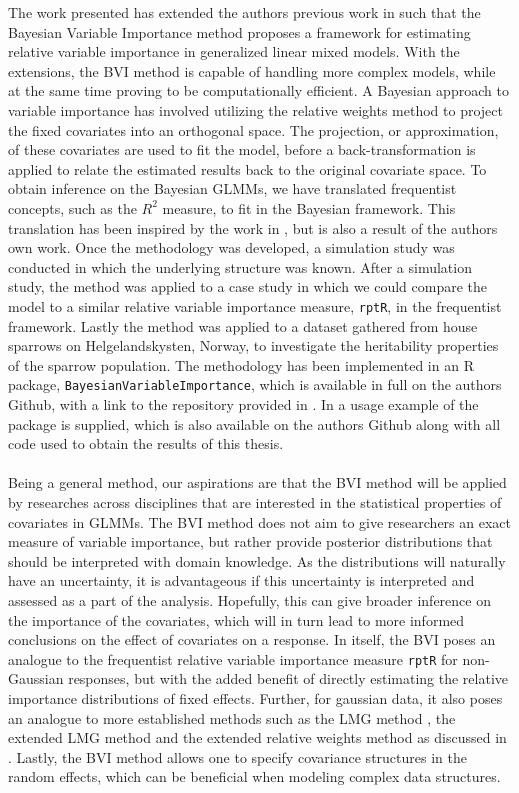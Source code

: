


The work presented has extended the authors previous work in \citet{Arnstad} such that the Bayesian Variable Importance method proposes a framework for estimating relative variable importance in generalized linear mixed models. With the extensions, the BVI method is capable of handling more complex models, while at the same time proving to be computationally efficient. A Bayesian approach to variable importance has involved utilizing the relative weights method \citep{johnson_relative_weights} to project the fixed covariates into an orthogonal space. The projection, or approximation, of these covariates are used to fit the model, before a back-transformation is applied to relate the estimated results back to the original covariate space. To obtain inference on the Bayesian GLMMs, we have translated frequentist concepts, such as the $R^2$ measure, to fit in the Bayesian framework. This translation has been inspired by the work in \citet{gelman2017rsquared}, but is also a result of the authors own work. Once the methodology was developed, a simulation study was conducted in which the underlying structure was known. After a simulation study, the method was applied to a case study in which we could compare the model to a similar relative variable importance measure, \texttt{rptR}, in the frequentist framework. Lastly the method was applied to a dataset gathered from house sparrows on Helgelandskysten, Norway, to investigate the heritability properties of the sparrow population. The methodology has been implemented in an R package, \texttt{BayesianVariableImportance}, which is available in full on the authors Github, with a link to the repository provided in . In  a usage example of the package is supplied, which is also available on the authors Github along with all code used to obtain the results of this thesis.
\\
\\
Being a general method, our aspirations are that the BVI method will be applied by researches across disciplines that are interested in the statistical properties of covariates in GLMMs. The BVI method does not aim to give researchers an exact measure of variable importance, but rather provide posterior distributions that should be interpreted with domain knowledge. As the distributions will naturally have an uncertainty, it is advantageous if this uncertainty is interpreted and assessed as a part of the analysis. Hopefully, this can give broader inference on the importance of the covariates, which will in turn lead to more informed conclusions on the effect of covariates on a response. In itself, the BVI poses an analogue to the frequentist relative variable importance measure \texttt{rptR} for non-Gaussian responses, but with the added benefit of directly estimating the relative importance distributions of fixed effects. Further, for gaussian data, it also poses an analogue to more established methods such as the LMG method \citep{gromping_relaimpo}, the extended LMG method \citep{matre} and the extended relative weights method \citep{matre} as discussed in \citet{Arnstad}. Lastly, the BVI method allows one to specify covariance structures in the random effects, which can be beneficial when modeling complex data structures.
